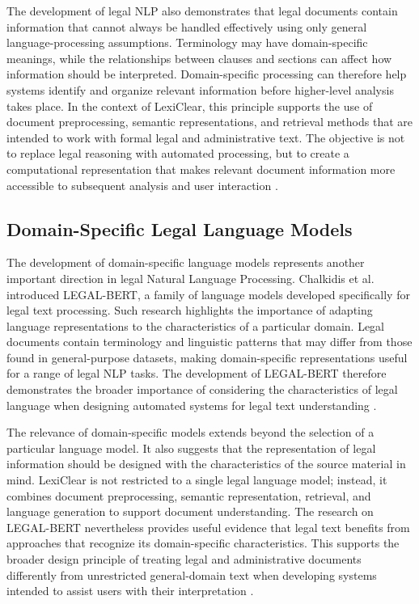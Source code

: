 \documentclass[12pt,a4paper,oneside]{report}
\begin{document}
The development of legal NLP also demonstrates that legal documents contain
information that cannot always be handled effectively using only general
language-processing assumptions. Terminology may have domain-specific
meanings, while the relationships between clauses and sections can affect how
information should be interpreted. Domain-specific processing can therefore
help systems identify and organize relevant information before higher-level
analysis takes place. In the context of LexiClear, this principle supports
the use of document preprocessing, semantic representations, and retrieval
methods that are intended to work with formal legal and administrative text.
The objective is not to replace legal reasoning with automated processing, but
to create a computational representation that makes relevant document
information more accessible to subsequent analysis and user interaction
\cite{bommarito2018lexnlp}.

\subsection{Domain-Specific Legal Language Models}

The development of domain-specific language models represents another
important direction in legal Natural Language Processing. Chalkidis et al.
introduced LEGAL-BERT, a family of language models developed specifically for
legal text processing. Such research highlights the importance of adapting
language representations to the characteristics of a particular domain.
Legal documents contain terminology and linguistic patterns that may differ
from those found in general-purpose datasets, making domain-specific
representations useful for a range of legal NLP tasks. The development of
LEGAL-BERT therefore demonstrates the broader importance of considering the
characteristics of legal language when designing automated systems for legal
text understanding
\cite{chalkidis2020legalbert}.

The relevance of domain-specific models extends beyond the selection of a
particular language model. It also suggests that the representation of legal
information should be designed with the characteristics of the source material
in mind. LexiClear is not restricted to a single legal language model;
instead, it combines document preprocessing, semantic representation,
retrieval, and language generation to support document understanding. The
research on LEGAL-BERT nevertheless provides useful evidence that legal text
benefits from approaches that recognize its domain-specific characteristics.
This supports the broader design principle of treating legal and
administrative documents differently from unrestricted general-domain text
when developing systems intended to assist users with their interpretation
\cite{chalkidis2020legalbert}.
\end{document}
